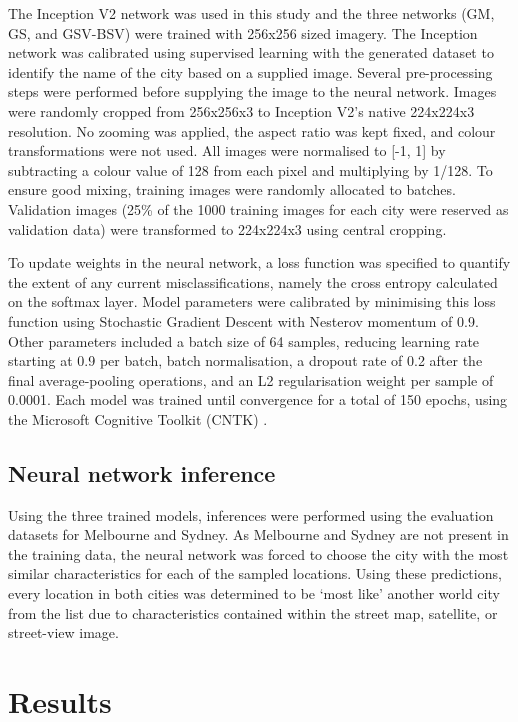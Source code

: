 \documentclass[10pt,letterpaper]{article}
\begin{document}
The Inception V2 network was used in this study and the three networks (GM, GS, and GSV-BSV) were trained with 256x256 sized imagery. The Inception network was calibrated using supervised learning with the generated dataset to identify the name of the city based on a supplied image. Several pre-processing steps were performed before supplying the image to the neural network. Images were randomly cropped from 256x256x3 to Inception V2's native 224x224x3 resolution. No zooming was applied, the aspect ratio was kept fixed, and colour transformations were not used. All images were normalised to [-1, 1] by subtracting a colour value of 128 from each pixel and multiplying by 1/128. To ensure good mixing, training images were randomly allocated to batches. Validation images (25\% of the 1000 training images for each city were reserved as validation data) were transformed to 224x224x3 using central cropping.


To update weights in the neural network, a loss function was specified to quantify the extent of any current misclassifications, namely the cross entropy calculated on the softmax layer. Model parameters were calibrated by minimising this loss function using Stochastic Gradient Descent with Nesterov momentum of 0.9. Other parameters included a batch size of 64 samples, reducing learning rate starting at 0.9 per batch, batch normalisation, a dropout rate of 0.2 after the final average-pooling operations, and an L2 regularisation weight per sample of 0.0001. Each model was trained until convergence for a total of 150 epochs, using the Microsoft Cognitive Toolkit (CNTK) \cite{Yu2015}. 


\subsection*{Neural network inference}\label{sec:methods5}    
Using the three trained models, inferences were performed using the evaluation datasets for Melbourne and Sydney. As Melbourne and Sydney are not present in the training data, the neural network was forced to choose the city with the most similar characteristics for each of the sampled locations. Using these predictions, every location in both cities was determined to be `most like' another world city from the list due to  characteristics contained within the street map, satellite, or street-view image.



\section*{Results}\label{sec:results}
\end{document}
